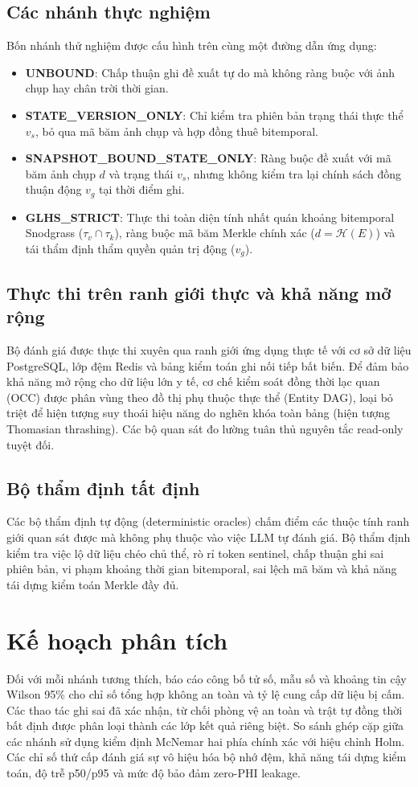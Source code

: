 \documentclass[11pt]{article}
\begin{document}
\subsection{Các nhánh thực nghiệm}
Bốn nhánh thử nghiệm được cấu hình trên cùng một đường dẫn ứng dụng:
\begin{itemize}
\item \textbf{UNBOUND}: Chấp thuận ghi đề xuất tự do mà không ràng buộc với ảnh chụp hay chân trời thời gian.
\item \textbf{STATE\_VERSION\_ONLY}: Chỉ kiểm tra phiên bản trạng thái thực thể $v_s$, bỏ qua mã băm ảnh chụp và hợp đồng thuê bitemporal.
\item \textbf{SNAPSHOT\_BOUND\_STATE\_ONLY}: Ràng buộc đề xuất với mã băm ảnh chụp $d$ và trạng thái $v_s$, nhưng không kiểm tra lại chính sách đồng thuận động $v_g$ tại thời điểm ghi.
\item \textbf{GLHS\_STRICT}: Thực thi toàn diện tính nhất quán khoảng bitemporal Snodgrass ($\tau_v \cap \tau_k$), ràng buộc mã băm Merkle chính xác ($d = \mathcal{H}(E)$) và tái thẩm định thẩm quyền quản trị động ($v_g$).
\end{itemize}

\subsection{Thực thi trên ranh giới thực và khả năng mở rộng}
Bộ đánh giá được thực thi xuyên qua ranh giới ứng dụng thực tế với cơ sở dữ liệu PostgreSQL, lớp đệm Redis và bảng kiểm toán ghi nối tiếp bất biến. Để đảm bảo khả năng mở rộng cho dữ liệu lớn y tế, cơ chế kiểm soát đồng thời lạc quan (OCC) được phân vùng theo đồ thị phụ thuộc thực thể (Entity DAG), loại bỏ triệt để hiện tượng suy thoái hiệu năng do nghẽn khóa toàn bảng (hiện tượng Thomasian thrashing). Các bộ quan sát đo lường tuân thủ nguyên tắc read-only tuyệt đối.

\subsection{Bộ thẩm định tất định}
Các bộ thẩm định tự động (deterministic oracles) chấm điểm các thuộc tính ranh giới quan sát được mà không phụ thuộc vào việc LLM tự đánh giá. Bộ thẩm định kiểm tra việc lộ dữ liệu chéo chủ thể, rò rỉ token sentinel, chấp thuận ghi sai phiên bản, vi phạm khoảng thời gian bitemporal, sai lệch mã băm và khả năng tái dựng kiểm toán Merkle đầy đủ.

\section{Kế hoạch phân tích}
Đối với mỗi nhánh tương thích, báo cáo công bố tử số, mẫu số và khoảng tin cậy Wilson 95\% cho chỉ số tổng hợp không an toàn và tỷ lệ cung cấp dữ liệu bị cấm. Các thao tác ghi sai đã xác nhận, từ chối phòng vệ an toàn và trật tự đồng thời bất định được phân loại thành các lớp kết quả riêng biệt. So sánh ghép cặp giữa các nhánh sử dụng kiểm định McNemar hai phía chính xác với hiệu chỉnh Holm. Các chỉ số thứ cấp đánh giá sự vô hiệu hóa bộ nhớ đệm, khả năng tái dựng kiểm toán, độ trễ p50/p95 và mức độ bảo đảm zero-PHI leakage.
\end{document}
